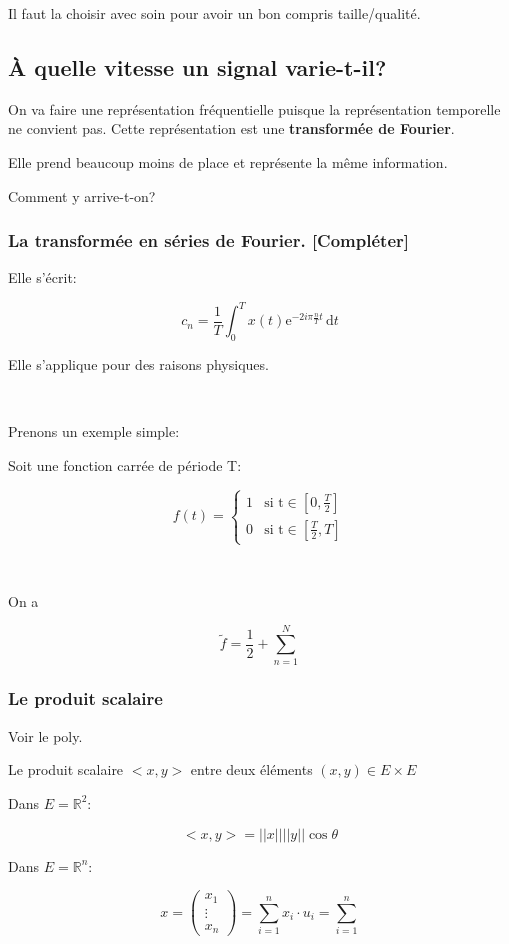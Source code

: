 \documentclass[a4paper,11pt]{article}
\newcommand{\R}{\mathbb{R}}
\newcommand{\e}{\mathrm{e}}
\begin{document}
Il faut la choisir avec soin pour avoir un bon compris taille/qualité.

\subsection{À quelle vitesse un signal varie-t-il?}

On va faire une représentation fréquentielle puisque la représentation
temporelle ne convient pas. Cette représentation est une \textbf{transformée de
 Fourier}.

Elle prend beaucoup moins de place et représente la même information.

Comment y arrive-t-on?

\subsubsection{La transformée en séries de Fourier. [Compléter]}

Elle s'écrit:

$$ c_n = \frac{1}{T} \int_0^T x(t) \e ^{-2 i \pi \frac{n}{T} t} \, \text{d} t $$

Elle s'applique pour des raisons physiques.

\

Prenons un exemple simple:

Soit une fonction carrée de période T:

\[ f(t) =
\begin{cases}
  1 &\text{si t} \in [0, \frac{T}{2}] \\
  0 &\text{si t} \in [\frac{T}{2}, T]
\end{cases} \]

\

On a

$$ \tilde{f}  = \frac{1}{2} + \sum^N_{n = 1} $$

\subsubsection{Le produit scalaire}

Voir le poly.

Le produit scalaire $<x, y>$ entre deux éléments $(x, y) \in E \times E$

Dans $E = \R ^2$:

$$<x, y> = ||x|| ||y|| \cos{\theta}$$

Dans $E = \R ^ n$:

\[ x = \left( \begin{matrix} x_1 \\ \vdots \\ x_n \end{matrix} \right) =
\sum^n_{i = 1} x_i \cdot u_i = \sum^n_{i = 1} \]
\end{document}
